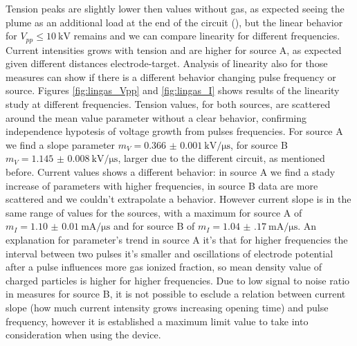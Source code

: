 Tension peaks are slightly lower then values without gas, as expected seeing the plume as an additional load at the end of the circuit (\cite{lieberman1994principles}), but the linear behavior for $V_{pp} \le \SI{10}{\kilo\volt}$ remains and we can compare linearity for different frequencies. Current intensities grows with tension and are higher for source A, as expected given different distances electrode-target. Analysis of linearity also for those measures can show if there is a different behavior changing pulse frequency or source.
Figures \ref{fig:lingas_Vpp} and \ref{fig:lingas_I} shows results of the linearity study at different frequencies.
Tension values, for both sources, are scattered around the mean value parameter without a clear behavior, confirming independence hypotesis of voltage growth from pulses frequencies. For source A we find a slope parameter $m_{V} = \SI{0.366(1)}{\kilo\volt/\micro\second}$, for source B $m_{V} = \SI{1.145(8)}{\kilo\volt/\micro\second}$, larger due to the different circuit, as mentioned before.
Current values shows a different behavior: in source A we find a stady increase of parameters with higher frequencies, in source B data are more scattered and we couldn't extrapolate a behavior. However current slope is in the same range of values for the sources, with a maximum for source A of $m_{I} = \SI{1.10(1)}{\milli\ampere/\micro\second}$ and for source B of $m_{I} = \SI{1.04(17)}{\milli\ampere/\micro\second}$.
An explanation for parameter's trend in source A it's that for higher frequencies the interval between two pulses it's smaller and oscillations of electrode potential after a pulse influences more gas ionized fraction, so mean density value of charged particles is higher for higher frequencies. 
Due to low signal to noise ratio in measures for source B, it is not possible to esclude a relation between current slope (how much current intensity grows increasing opening time) and pulse frequency, however it is established a maximum limit value to take into consideration when using the device.

